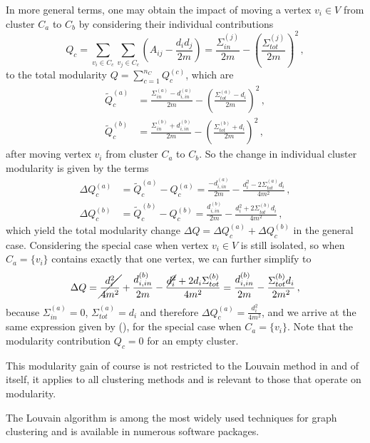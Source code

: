 \documentclass[12pt, a4paper]{article}
\begin{document}
  In more general terms, one may obtain the impact of moving a vertex $v_i \in V$ from cluster $C_a$ to $C_b$ by considering their individual contributions
  $$Q_c = \sum_{v_i \in C_c} \sum_{v_j \in C_c} \left(A_{ij} - \frac{d_i d_j}{2m}\right) = \frac{\Sigma_{in}^{(j)}}{2m} - \left(\frac{\Sigma_{tot}^{(j)}}{2m}\right)^2\,,$$
  to the total modularity $Q = \sum_{c=1}^{n_C} Q_c^{(c)}$, which are
  \begin{align*}
    \tilde{Q}_c^{(a)} & = \frac{\Sigma_{in}^{(a)} - d_{i, in}^{(a)}}{2m} - \left(\frac{\Sigma_{tot}^{(a)} - d_i}{2m}\right)^2\,, \\
    \tilde{Q}_c^{(b)} & = \frac{\Sigma_{in}^{(b)} + d_{i, in}^{(b)}}{2m} - \left(\frac{\Sigma_{tot}^{(b)} + d_i}{2m}\right)^2\,,
  \end{align*}
  after moving vertex $v_i$ from cluster $C_a$ to $C_b$.
  So the change in individual cluster modularity is given by the terms
  \begin{align*}
    \Delta Q_c^{(a)} & = \tilde{Q}_c^{(a)} - Q_c^{(a)} = \frac{-d_{i, in}^{(a)}}{2m} - \frac{d_i^2 - 2 \Sigma_{tot}^{(a)} d_i}{4m^2}\,, \\
    \Delta Q_c^{(b)} & = \tilde{Q}_c^{(b)} - Q_c^{(b)} = \frac{d_{i, in}^{(b)}}{2m} - \frac{d_i^2 + 2 \Sigma_{tot}^{(b)} d_i}{4m^2}\,,
  \end{align*}
  which yield the total modularity change $\Delta Q = \Delta Q_c^{(a)} + \Delta Q_c^{(b)}$ in the general case.
  Considering the special case when vertex $v_i \in V$ is still isolated, so when $C_a = \{v_i\}$ contains exactly that one vertex, we can further simplify to
  $$\Delta Q = \cancel{\frac{d_i^2}{4m^2}} + \frac{d_{i,in}^{(b)}}{2m} - \frac{\cancel{d_i^2} + 2 d_i \Sigma_{tot}^{(b)}}{4m^2} = \frac{d_{i,in}^{(b)}}{2m} - \frac{\Sigma_{tot}^{(b)} d_i}{2m^2} \,,$$
  because $\Sigma_{in}^{(a)} = 0$, $\Sigma_{tot}^{(a)} = d_i$ and therefore $\Delta Q_c^{(a)} = \frac{d_i^2}{4m^2}$, and we arrive at the same expression given by \cite{lambiotte-louvain-clustering} (), for the special case when $C_a = \{v_i\}$.
  Note that the modularity contribution $Q_c = 0$ for an empty cluster.

  This modularity gain of course is not restricted to the Louvain method in and of itself, it applies to all clustering methods and is relevant to those that operate on modularity.

  The Louvain algorithm is among the most widely used techniques for graph clustering and is available in numerous software packages.
\end{document}
